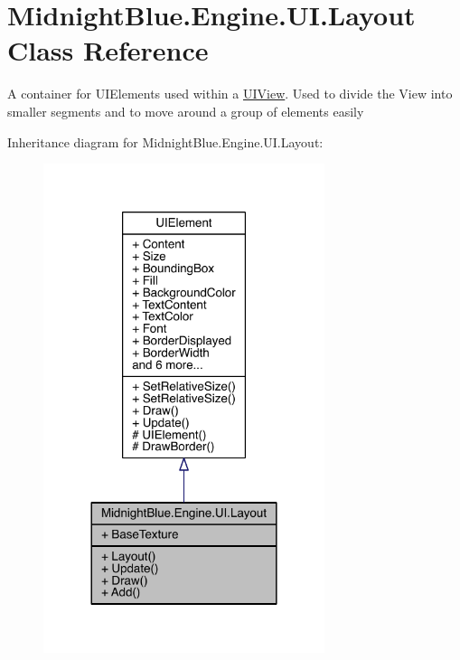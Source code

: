 \hypertarget{class_midnight_blue_1_1_engine_1_1_u_i_1_1_layout}{}\section{Midnight\+Blue.\+Engine.\+U\+I.\+Layout Class Reference}
\label{class_midnight_blue_1_1_engine_1_1_u_i_1_1_layout}


A container for U\+I\+Elements used within a \hyperlink{class_midnight_blue_1_1_engine_1_1_u_i_1_1_u_i_view}{U\+I\+View}. Used to divide the View into smaller segments and to move around a group of elements easily  




Inheritance diagram for Midnight\+Blue.\+Engine.\+U\+I.\+Layout\+:
\nopagebreak
\begin{figure}[H]
\begin{center}
\leavevmode
\includegraphics[width=233pt]{class_midnight_blue_1_1_engine_1_1_u_i_1_1_layout__inherit__graph}
\end{center}
\end{figure}


